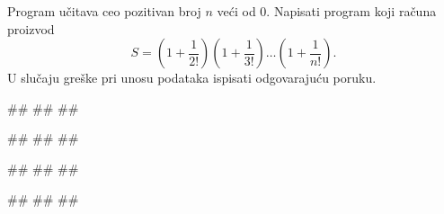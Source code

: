 \begin{Exercise}[difficulty=1, label=1.3_47] 
Program učitava ceo pozitivan broj $n$ veći od $0$.  Napisati program
koji računa proizvod
$$S = (1 + \frac{1}{2!})(1 + \frac{1}{3!})\ldots(1 +
\frac{1}{n!}).$$ U slučaju greške pri unosu podataka ispisati 
odgovarajuću  poruku.  
  
\begin{miditest}
\begin{upotreba}{1}
#\naslovInt#
##
##
\end{upotreba}
\end{miditest}
\begin{miditest}
\begin{upotreba}{2}
#\naslovInt#
##
##
\end{upotreba}
\end{miditest}

\begin{miditest}
\begin{upotreba}{3}
#\naslovInt#
##
##
\end{upotreba}
\end{miditest}
\begin{miditest}
\begin{upotreba}{4}
#\naslovInt#
##
##
\end{upotreba}
\end{miditest}
\end{Exercise}
\begin{Answer}[ref=1.3_47]
\end{Answer}

